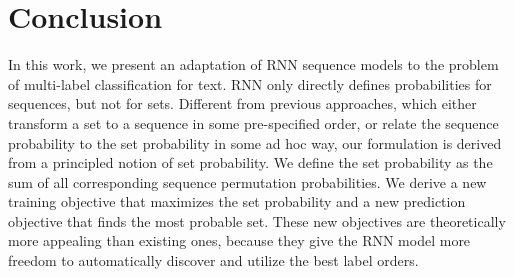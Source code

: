 \section{Conclusion}
In this work, we present an adaptation of RNN sequence models to the problem of multi-label classification for text. RNN only directly defines probabilities for sequences, but not for sets. Different from previous approaches, which either transform a set to a sequence in some pre-specified order, or relate the sequence probability to the set probability in some ad hoc way, our formulation is derived from a principled notion of set probability. We define the set probability as the sum of all corresponding sequence permutation probabilities. We derive a new training objective that maximizes the set probability and a new prediction objective that finds the most probable set. These new objectives are theoretically more appealing than existing ones, because they give the RNN model more freedom to automatically discover and utilize the best label orders.

\label{sec:conclusion}